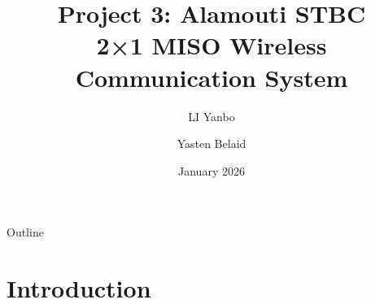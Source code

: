 \documentclass[aspectratio=169]{beamer}
\title[Alamouti STBC]{Project 3: Alamouti STBC\\2×1 MISO Wireless Communication System}
\author{LI Yanbo \and Yasten Belaid}
\institute[Sorbonne]{Sorbonne Université\\MU5EEF08 - Wireless Communications}
\date{January 2026}
\begin{document}
\begin{frame}
  \titlepage
\end{frame}

\begin{frame}{Outline}
  \tableofcontents
\end{frame}

\section{Introduction}
\end{document}
